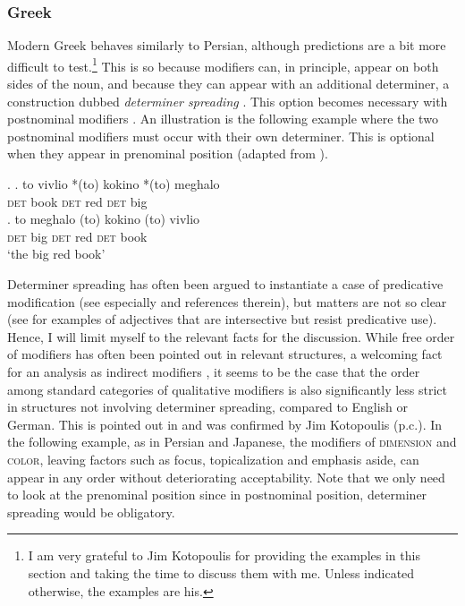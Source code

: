 \documentclass [output=book,colorlinks,citecolor=brown]{langscibook}
\begin{document}
\subsubsection{Greek}

Modern Greek behaves similarly to Persian, although predictions are a bit more difficult to test.\footnote{I am very grateful to Jim Kotopoulis for providing the examples in this section and taking the time to discuss them with me. Unless indicated otherwise, the examples are his.} This is so because modifiers can, in principle, appear on both sides of the noun, and because they can appear with an additional determiner, a construction dubbed \textit{determiner spreading} \citep{androutsopoulou:1995:ds}. This option becomes necessary with postnominal modifiers \citep{alex:1998:adj, alex:2003:adj, campos:2004:ds, panagiotidis:2011:ds, lekakou:2012:poly, panayidou:2013:in}. An illustration is the following example where the two postnominal modifiers must occur with their own determiner. This is optional when they appear in prenominal position (adapted from \citealt[303]{alex:1998:adj}). %


\ex. \ag. to vivlio *(to) kokino *(to) meghalo\\
\textsc{det} book \textsc{det} red \textsc{det} big\\
\bg. to meghalo (to) kokino (to) vivlio\\
\textsc{det} big \textsc{det} red \textsc{det} book\\
`the big red book’

Determiner spreading has often been argued to instantiate a case of predicative modification (see especially \citealt[A3]{cinque:2010:adj} and references therein), but matters are not so clear (see \citealt{lekakou:2012:poly} for examples of adjectives that are intersective but resist predicative use). Hence, I will limit myself to the relevant facts for the discussion. While free order of modifiers has often been pointed out in relevant structures, a welcoming fact for an analysis as indirect modifiers \citep{alex:1998:adj, alex:2007:nounphrase, cinque:2010:adj}, it seems to be the case that the order among standard categories of qualitative modifiers is also significantly less strict in structures not involving determiner spreading, compared to English or German. This is pointed out in \citet[174]{laenzlinger:2011:elements} and was confirmed by Jim Kotopoulis (p.c.). In the following example, as in Persian and Japanese, the modifiers of \textsc{dimension} and \textsc{color}, leaving factors such as focus, topicalization and emphasis aside, can appear in any order without deteriorating acceptability. Note that we only need to look at the prenominal position since in postnominal position, determiner spreading would be obligatory. %
\end{document}
